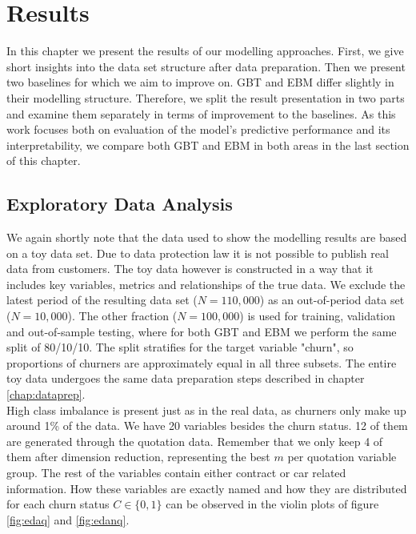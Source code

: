 \documentclass[12pt,titlepage]{article}
\begin{document}
\section{Results} \par

In this chapter we present the results of our modelling approaches. First, we give short insights into the data set structure after data preparation. Then we present two baselines for which we aim to improve on. GBT and EBM differ slightly in their modelling structure. Therefore, we split the result presentation in two parts and examine them separately in terms of improvement to the baselines. As this work focuses both on evaluation of the model's predictive performance and its interpretability, we compare both GBT and EBM in both areas in the last section of this chapter. \\

\subsection{Exploratory Data Analysis} \par

We again shortly note that the data used to show the modelling results are based on a toy data set. Due to data protection law it is not possible to publish real data from customers. The toy data however is constructed in a way that it includes key variables, metrics and relationships of the true data. We exclude the latest period of the resulting data set ($N=110,000$) as an out-of-period data set ($N=10,000$). The other fraction ($N=100,000$) is used for training, validation and out-of-sample testing, where for both GBT and EBM we perform the same split of 80/10/10. The split stratifies for the target variable "churn", so proportions of churners are approximately equal in all three subsets. The entire toy data undergoes the same data preparation steps described in chapter \ref{chap:dataprep}. \\
High class imbalance is present just as in the real data, as churners only make up around 1\% of the data. We have 20 variables besides the churn status. 12 of them are generated through the quotation data. Remember that we only keep 4 of them after dimension reduction, representing the best $m$ per quotation variable group. The rest of the variables contain either contract or car related information. How these variables are exactly named and how they are distributed for each churn status $C\in \{0,1\}$ can be observed in the violin plots of figure \ref{fig:edaq} and \ref{fig:edanq}. \\
\noindent
\end{document}
